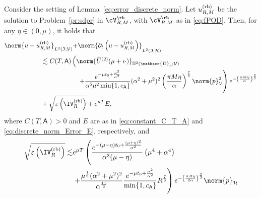 \begin{theorem}\label{thm:fully_discrete_error}
Consider the setting of Lemma~\ref{eq:error_discrete_norm}. 
Let $u^{\normalfont\text{(rb)}}_{R,M}$ be the solution to Problem~\ref{pr:sdpr} in $\cV^\rb_{R,M}$,
with $\cV^\rb_{R,M}$ as in \eqref{eq:fPOD}.
%
Then, for any $\eta \in (0,\mu)$, it holds that
\begin{equation}\label{eq:error_bound_fully_discrete}
\begin{aligned}
	\norm{
		u
		-
		u^{\normalfont\text{(rb)}}_{R,M}
	}_{L^2(\mathfrak{I};\mathcal{V})}
    +
    &
	\norm{
		\partial_t 
		\left(
			u
			-
			u^{\normalfont\text{(rb)}}_{R,M}
		\right)
	}_{L^2(\mathfrak{I};\mathcal{H})}
	\\
	&
    \hspace{-2cm}
    \lesssim
    C(T,\mathsf{A})
    \left(
       	\norm{
    		\widehat{U}^{(2)}(\mu+\imath \cdot) 
    	}_{\mathbb{H}^2(\mathscr{D}_\eta;\mathcal{V})}
    \right.
    \\
    &
    \left.
        +
		\frac{e^{-\mu t_0+\frac{\mu^2}{\alpha^2}}}{\alpha^5 \mu^2 \min\{1, c_{\mathsf{A}}\}}
    		(\alpha^2+\mu^2)^2
    		\left(\frac{\pi M \eta}{\alpha} \right)^\frac{7}{6}
        \norm{p}^2_{\mathcal{V}} 
	\right)
	e^{-\left(\frac{\pi M \eta}{\alpha} \right)^{\frac{2}{3}}}
	\\
	&
    \hspace{-2cm}
    + 
    \sqrt{
        \varepsilon
	\left(
		\IV^{\normalfont\text{(rb)}}_{R}
	\right)
    }
    +
    e^{\mu T}E,
\end{aligned}
\end{equation}
where $C(T,\mathsf{A})>0$ and $E$ are as in \eqref{eq:constant_C_T_A}
and \eqref{eq:discrete_norm_Error_E}, respectively, and 
\begin{equation}
\begin{aligned}
    \sqrt{
        \varepsilon
	\left(
		\IV^{\normalfont\text{(rb)}}_{R}
	\right)
    }
    \lesssim
    &
    e^{\mu T}
    \left(
    \frac{e^{-(\mu-\eta) t_0+\frac{(\mu+\eta)^2}{\alpha^2}}}{\alpha^3(\mu-\eta)}
    \left(
		\mu^4
		+
		\alpha^4
    \right)
        \right.
        \\
        &
        \left.
        +
   \frac{
   	   \mu^{\frac{1}{6}}
   		(\alpha^2+\mu^2)^2 
   }{
   	\alpha^{\frac{11}{3}}
   }
    \frac{
        e^{-\mu t_0 + \frac{\mu^2}{\alpha^2}}
        }{
        \min\{1, c_{\mathsf{A}}\}
    }
    R^\frac{7}{6}
    \right)
	e^{
		-\left(\frac{\pi R \eta}{2\alpha} \right)^{\frac{2}{3}}
	}
	 \norm{p}_\mathcal{H}

\end{aligned}
\end{equation}
\end{theorem}
